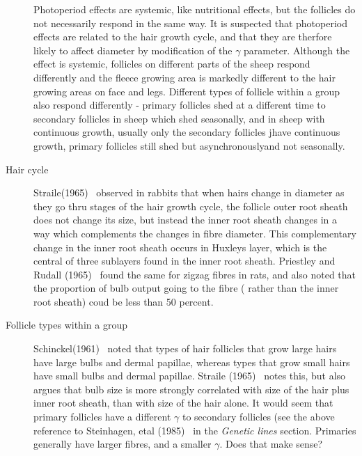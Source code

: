 \documentclass[titlepage]{article}  %
\begin{document}
\begin{description}
Photoperiod effects are systemic, like nutritional effects, but the follicles do not necessarily respond in the same way. It is suspected that photoperiod effects are related to the hair growth cycle,  and that they are therfore likely to affect diameter by modification of the $\gamma$ parameter. Although the effect is systemic, follicles on different parts of the sheep respond differently and the fleece growing area is markedly different to the hair growing areas on face and legs. Different types of follicle within a group also respond differently - primary follicles shed at a different time to secondary follicles in sheep which shed seasonally, and in sheep with continuous growth, usually only the secondary follicles jhave continuous growth, primary follicles still shed but asynchronouslyand not seasonally.
\item[Hair cycle] Straile(1965)~\cite{stra:65} observed in rabbits that when hairs change in diameter as they go thru stages of the hair growth cycle, the follicle outer root sheath does not change its size, but instead the inner root sheath changes in a way which complements the changes in fibre diameter. This complementary change in the inner root sheath occurs in Huxleys layer, which is the central of three sublayers found in the inner root sheath. 
Priestley and Rudall (1965)~\cite{prie:65} found the same for zigzag fibres in rats, and also noted that the proportion of bulb output going to the fibre ( rather than the inner root sheath) coud be less than 50 percent.
\item[Follicle types within a group] Schinckel(1961)~\cite{schi:61} noted that types of hair follicles that grow large hairs have large bulbs and dermal papillae, whereas types that grow small hairs have small bulbs and dermal papillae. Straile (1965)~\cite{stra:65} notes this, but also argues that bulb size is more strongly correlated with size of the hair plus inner root sheath, than with size of the hair alone.
It would seem that primary follicles have a different $\gamma$ to secondary follicles (see the above reference to Steinhagen, etal (1985)~\cite{stei:85} in the {\em Genetic lines} section. Primaries generally have larger fibres, and a smaller $\gamma$. Does that make sense?
\end{description}
\end{document}
